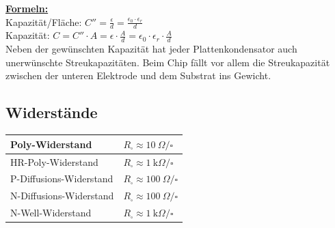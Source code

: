 \begin{minipage}[c]{0.55\textwidth}
	\uline{\textbf{Formeln:}}\\
	Kapazität/Fläche: $C'' = \frac{\epsilon}{d} = \frac{\epsilon_0 \cdot \epsilon_r}{d}$\\
	Kapazität: \hspace{11.5mm}$C = C'' \cdot A = \epsilon\cdot\frac{A}{d}=\epsilon_0\cdot\epsilon_r\cdot\frac{A}{d}$ \\
	Neben der gewünschten Kapazität hat jeder Plattenkondensator auch unerwünschte Streukapazitäten. 
	Beim Chip fällt vor allem die Streukapazität zwischen der unteren Elektrode und dem Substrat ins Gewicht.
\end{minipage}

\subsection{Widerstände}
\begin{minipage}[c]{0.55\textwidth}
	\begin{tabular}{|l|l|}
		\hline
		Poly-Widerstand & $R_\square \approx \SI{10}{\Omega \per}\square$\\ \hline
		HR-Poly-Widerstand & $R_\square \approx \SI{1}{\kilo\Omega \per}\square$\\ \hline
		P-Diffusions-Widerstand & $R_\square \approx \SI{100}{\Omega \per}\square$\\ \hline
		N-Diffusions-Widerstand & $R_\square \approx \SI{100}{\Omega \per}\square$\\ \hline
		N-Well-Widerstand & $R_\square \approx \SI{1}{\kilo\Omega \per}\square$\\ \hline
	\end{tabular}
\end{minipage}
